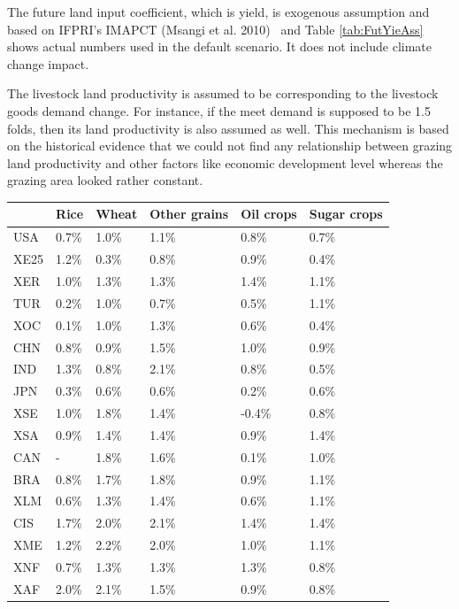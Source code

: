 \documentclass[10pt,a4paper,titlepage,dvipdfmx]{book}
\begin{document}
\begin{itemize}
The future land input coefficient, which is yield, is exogenous assumption and based on IFPRI's IMAPCT (Msangi et al. 2010)~\cite{RN2538} and Table \ref{tab:FutYieAss} shows actual numbers used in the default scenario. It does not include climate change impact.

The livestock land productivity is assumed to be corresponding to the livestock goods demand change. For instance, if the meet demand is supposed to be 1.5 folds, then its land productivity is also assumed as well. This mechanism is based on the historical evidence that we could not find any relationship between grazing land productivity and other factors like economic development level whereas the grazing area looked rather constant.


\begin{tabularx}{\textwidth}{|
p{}|
p{}|
p{}|
p{}|
p{}|
p{}|} 
\caption{\label{tab:FutYieAss}Future yield assumptions}\\
\hline 
 & Rice & Wheat & Other grains & Oil crops & Sugar crops \\\hline 
USA & 0.7\% & 1.0\% & 1.1\% & 0.8\% & 0.7\% \\\hline 
XE25 & 1.2\% & 0.3\% & 0.8\% & 0.9\% & 0.4\% \\\hline 
XER & 1.0\% & 1.3\% & 1.3\% & 1.4\% & 1.1\% \\\hline 
TUR & 0.2\% & 1.0\% & 0.7\% & 0.5\% & 1.1\% \\\hline 
XOC & 0.1\% & 1.0\% & 1.3\% & 0.6\% & 0.4\% \\\hline 
CHN & 0.8\% & 0.9\% & 1.5\% & 1.0\% & 0.9\% \\\hline 
IND & 1.3\% & 0.8\% & 2.1\% & 0.8\% & 0.5\% \\\hline 
JPN & 0.3\% & 0.6\% & 0.6\% & 0.2\% & 0.6\% \\\hline 
XSE & 1.0\% & 1.8\% & 1.4\% & -0.4\% & 0.8\% \\\hline 
XSA & 0.9\% & 1.4\% & 1.4\% & 0.9\% & 1.4\% \\\hline 
CAN & - & 1.8\% & 1.6\% & 0.1\% & 1.0\% \\\hline 
BRA & 0.8\% & 1.7\% & 1.8\% & 0.9\% & 1.1\% \\\hline 
XLM & 0.6\% & 1.3\% & 1.4\% & 0.6\% & 1.1\% \\\hline 
CIS & 1.7\% & 2.0\% & 2.1\% & 1.4\% & 1.4\% \\\hline 
XME & 1.2\% & 2.2\% & 2.0\% & 1.0\% & 1.1\% \\\hline 
XNF & 0.7\% & 1.3\% & 1.3\% & 1.3\% & 0.8\% \\\hline 
XAF & 2.0\% & 2.1\% & 1.5\% & 0.9\% & 0.8\% \\\hline 
\end{tabularx}


\end{itemize}
\end{document}
